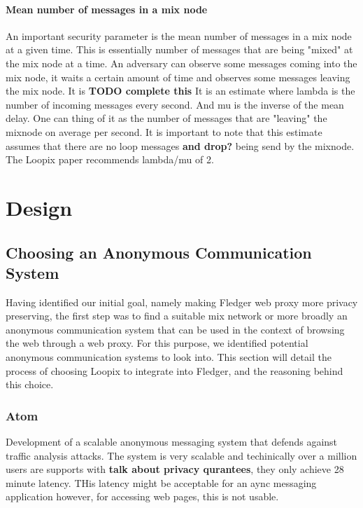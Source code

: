 \documentclass[a4paper,11pt,oneside]{report}
\begin{document}
\subsubsection{Mean number of messages in a mix node}
\label{sec:lambda_over_mu}
An important security parameter is the mean number of messages in a mix node at a given time. This is essentially number of messages that are being "mixed" at the mix node at a time. An adversary can observe some messages coming into the mix node, it waits a certain amount of time and observes some messages leaving the mix node. It is  \textbf{TODO complete this}
It is an estimate where lambda is the number of incoming messages every second. And mu is the inverse of the mean delay. One can thing of it as the number of messages that are "leaving" the mixnode on average per second. It is important to note that this estimate assumes that there are no loop messages \textbf{and drop?} being send by the mixnode. The Loopix paper recommends lambda/mu of 2. 

\chapter{Design}


\section{Choosing an Anonymous Communication System}
\label{sec:mixers}
Having identified our initial goal, namely making Fledger web proxy more privacy preserving, the first step was to find a suitable mix network or more broadly an anonymous communication system that can be used in the context of browsing the web through a web proxy. For this purpose, we identified potential anonymous communication systems to look into. This section will detail the process of choosing Loopix to integrate into Fledger, and the reasoning behind this choice.

\subsection{Atom}
Development of a scalable anonymous messaging system that defends against traffic analysis attacks. The system is very scalable and techinically over a million users are supports with \textbf{talk about privacy qurantees}, they only achieve 28 minute latency. THis latency might be acceptable for an aync messaging application however, for accessing web pages, this is not usable.
\end{document}
